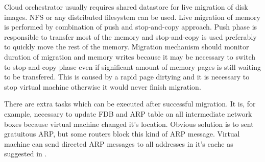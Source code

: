 Cloud orchestrator usually requires shared datastore for live migration of disk images. \Ac{NFS} or any distributed filesystem can be used. Live migration of 
memory is performed by combination of push and stop-and-copy approach. Push phase is responsible to transfer most of the memory and stop-and-copy is used preferably to quickly move the rest of the memory. Migration mechanism should monitor duration of migration and memory writes because it may be necessary to switch to stop-and-copy phase even if significant amount of memory pages is still waiting to be transfered. This is caused by a rapid page dirtying and it is necessary to stop virtual machine otherwise it would never finish migration.


There are extra tasks which can be executed after successful migration. It is, for example, necessary to update \Ac{FDB} and \Ac{ARP} table on all intermediate network boxes because virtual machine changed it's location. Obvious solution is to sent gratuitous \Ac{ARP}, but some routers block this kind of \Ac{ARP} message. Virtual machine can send directed \Ac{ARP} messages to all addresses in it's cache as suggested in \cite{live-migration-of-vms}. 
